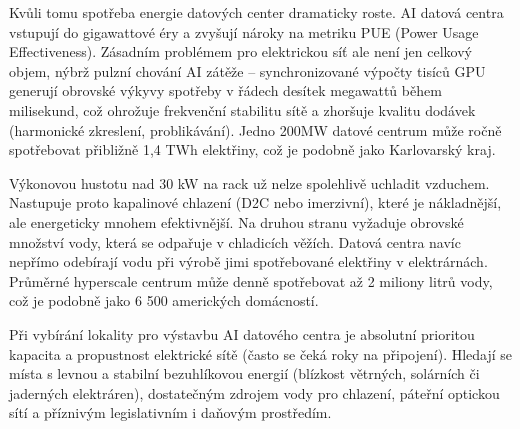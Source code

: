 Kvůli tomu spotřeba energie datových center dramaticky roste. AI datová centra vstupují do gigawattové éry a zvyšují nároky na metriku PUE (Power Usage Effectiveness). Zásadním problémem pro elektrickou síť ale není jen celkový objem, nýbrž pulzní chování AI zátěže – synchronizované výpočty tisíců GPU generují obrovské výkyvy spotřeby v řádech desítek megawattů během milisekund, což ohrožuje frekvenční stabilitu sítě a zhoršuje kvalitu dodávek (harmonické zkreslení, problikávání). Jedno 200MW datové centrum může ročně spotřebovat přibližně 1,4 TWh elektřiny, což je podobně jako Karlovarský kraj. \cite{chen_electricity_2025, sheng_power_2026, energeticky_regulacni_urad_spotreba_2024}

Výkonovou hustotu nad 30 kW na rack už nelze spolehlivě uchladit vzduchem. Nastupuje proto kapalinové chlazení (D2C nebo imerzivní), které je nákladnější, ale energeticky mnohem efektivnější. Na druhou stranu vyžaduje obrovské množství vody, která se odpařuje v chladicích věžích. Datová centra navíc nepřímo odebírají vodu při výrobě jimi spotřebované elektřiny v elektrárnách. Průměrné hyperscale centrum může denně spotřebovat až 2 miliony litrů vody, což je podobně jako 6 500 amerických domácností. \cite{li_making_2025,shah_four_2026,jegham_how_2025,cruzes_data_2025}

Při vybírání lokality pro výstavbu AI datového centra je absolutní prioritou kapacita a propustnost elektrické sítě (často se čeká roky na připojení). Hledají se místa s levnou a stabilní bezuhlíkovou energií (blízkost větrných, solárních či jaderných elektráren), dostatečným zdrojem vody pro chlazení, páteřní optickou sítí a příznivým legislativním i daňovým prostředím. \cite{lin_exploding_2024,chen_electricity_2025,pilz_compute_2023,geng_data_2014}